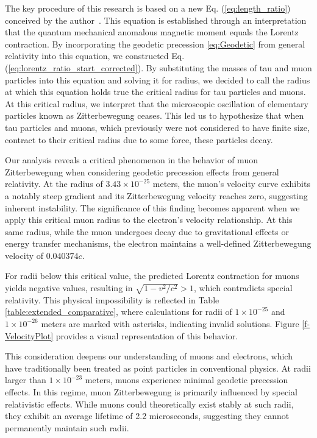 \documentclass[%
 reprint,
 amsmath,amssymb,
 aps,
]{revtex4-1}
\numberwithin{equation}{section}%
\begin{document}
The key procedure of this research is based on a new Eq. (\ref{eq:length_ratio}) conceived by the author~\cite{Hanamura2023}. This equation is established through an interpretation that the quantum mechanical anomalous magnetic moment equals the Lorentz contraction. By incorporating the geodetic precession \ref{eq:Geodetic} from general relativity into this equation, we constructed Eq. (\ref{eq:lorentz_ratio_start_corrected}). By substituting the masses of tau and muon particles into this equation and solving it for radius, we decided to call the radius at which this equation holds true the critical radius for tau particles and muons. At this critical radius, we interpret that the microscopic oscillation of elementary particles known as Zitterbewegung ceases. This led us to hypothesize that when tau particles and muons, which previously were not considered to have finite size, contract to their critical radius due to some force, these particles decay.

Our analysis reveals a critical phenomenon in the behavior of muon Zitterbewegung when considering geodetic precession effects from general relativity. At the radius of $3.43 \times 10^{-25}$ meters, the muon's velocity curve exhibits a notably steep gradient and its Zitterbewegung velocity reaches zero, suggesting inherent instability. The significance of this finding becomes apparent when we apply this critical muon radius to the electron's velocity relationship. At this same radius, while the muon undergoes decay due to gravitational effects or energy transfer mechanisms, the electron maintains a well-defined Zitterbewegung velocity of $0.040374c$.

For radii below this critical value, the predicted Lorentz contraction for muons yields negative values, resulting in $\sqrt{1 - {v^2}/{c^2}} > 1$, which contradicts special relativity. This physical impossibility is reflected in Table \ref{table:extended_comparative}, where calculations for radii of $1 \times 10^{-25}$ and $1 \times 10^{-26}$ meters are marked with asterisks, indicating invalid solutions. Figure \ref{f-VelocityPlot} provides a visual representation of this behavior.

This consideration deepens our understanding of muons and electrons, which have traditionally been treated as point particles in conventional physics. At radii larger than $1 \times 10^{-23}$ meters, muons experience minimal geodetic precession effects. In this regime, muon Zitterbewegung is primarily influenced by special relativistic effects. While muons could theoretically exist stably at such radii, they exhibit an average lifetime of 2.2 microseconds, suggesting they cannot permanently maintain such radii. 
\end{document}
